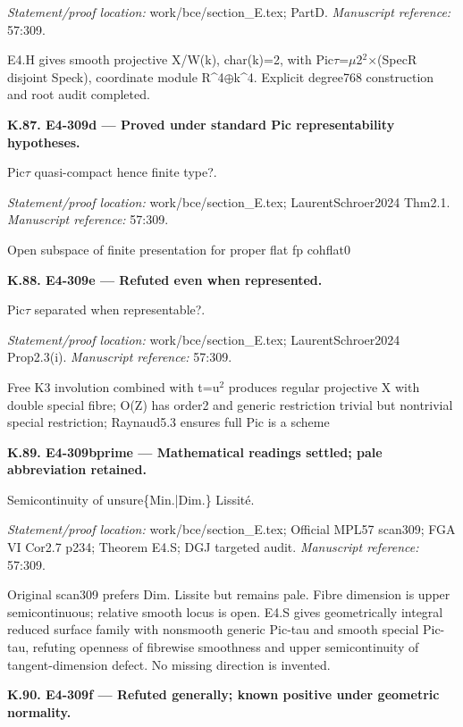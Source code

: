 \par\emph{Statement/proof location:} work/bce/section\_E.tex; PartD.
\emph{Manuscript reference:} 57:309.
\par E4.H gives smooth projective X/W(k), char(k)=2, with Pic\ensuremath{\tau}=\ensuremath{\mu}2\ensuremath{{}^2}×(SpecR disjoint Speck), coordinate module R\textasciicircum{}4\ensuremath{\oplus}k\textasciicircum{}4. Explicit degree768 construction and root audit completed.
\par\medskip\noindent\textbf{K.87. E4-309d --- Proved under standard Pic representability hypotheses.}\par
Pic\ensuremath{\tau} quasi-compact hence finite type?.
\par\emph{Statement/proof location:} work/bce/section\_E.tex; LaurentSchroer2024 Thm2.1.
\emph{Manuscript reference:} 57:309.
\par Open subspace of finite presentation for proper flat fp cohflat0
\par\medskip\noindent\textbf{K.88. E4-309e --- Refuted even when represented.}\par
Pic\ensuremath{\tau} separated when representable?.
\par\emph{Statement/proof location:} work/bce/section\_E.tex; LaurentSchroer2024 Prop2.3(i).
\emph{Manuscript reference:} 57:309.
\par Free K3 involution combined with t=u\ensuremath{{}^2} produces regular projective X with double special fibre; O(Z) has order2 and generic restriction trivial but nontrivial special restriction; Raynaud5.3 ensures full Pic is a scheme
\par\medskip\noindent\textbf{K.89. E4-309bprime --- Mathematical readings settled; pale abbreviation retained.}\par
Semicontinuity of unsure\{Min.|Dim.\} Lissité.
\par\emph{Statement/proof location:} work/bce/section\_E.tex; Official MPL57 scan309; FGA VI Cor2.7 p234; Theorem E4.S; DGJ targeted audit.
\emph{Manuscript reference:} 57:309.
\par Original scan309 prefers Dim. Lissite but remains pale. Fibre dimension is upper semicontinuous; relative smooth locus is open. E4.S gives geometrically integral reduced surface family with nonsmooth generic Pic-tau and smooth special Pic-tau, refuting openness of fibrewise smoothness and upper semicontinuity of tangent-dimension defect. No missing direction is invented.
\par\medskip\noindent\textbf{K.90. E4-309f --- Refuted generally; known positive under geometric normality.}\par
